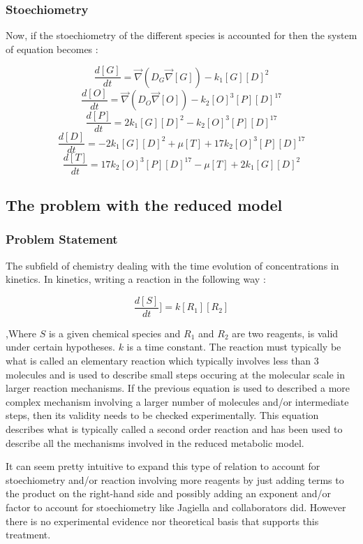 \documentclass[11pt,a4paper]{article}
\begin{document}
\subsubsection{Stoechiometry}
Now, if the stoechiometry of the different species is accounted for then the system of equation becomes : 


\[ \frac{d [G]}{d t} = \overrightarrow{\nabla} (D_G \overrightarrow{\nabla} [G]) - k_1 [G][D]^2  \]
\[ \frac{d [O]}{d t} = \overrightarrow{\nabla} (D_O \overrightarrow{\nabla} [O]) - k_2 [O]^3[P][D]^{17}  \]
\[ \frac{d [P]}{d t} =  2 k_1 [G][D]^2 - k_2 [O]^3[P][D]^{17}  \]
\[ \frac{d [D]}{d t} =  - 2 k_1[G][D]^2 + \mu [T] + 17 k_2 [O]^3[P][D]^{17}  \]
\[ \frac{d [T]}{d t} =  17 k_2 [O]^3[P][D]^{17} - \mu [T] + 2 k_1[G][D]^2 \]

\subsection{The problem with the reduced model}
\subsubsection{Problem Statement}
The subfield of chemistry dealing with the time evolution of concentrations in kinetics. In kinetics, writing a reaction in the following way : 

\[\frac{d [S]}{d t}] = k[R_1][R_2] \]

,Where $S$ is a given chemical species and $R_1$ and $R_2$ are two reagents, is valid under certain hypotheses. $k$ is a time constant. The reaction must typically be what is called an elementary reaction which typically involves less than 3 molecules and is used to describe small steps occuring at the molecular scale in larger reaction mechanisms. If the previous equation is used to described a more complex mechanism involving a larger number of molecules and/or intermediate steps, then its validity needs to be checked experimentally. This equation describes what is typically called a second order reaction and has been used to describe all the mechanisms involved in the reduced metabolic model.

It can seem pretty intuitive to expand this type of relation to account for stoechiometry and/or reaction involving more reagents by just adding terms to the product on the right-hand side and possibly adding an exponent and/or factor to account for stoechiometry like Jagiella and collaborators did. \cite{Jagiella2016} However there is no experimental evidence nor theoretical basis that supports this treatment.
\end{document}
